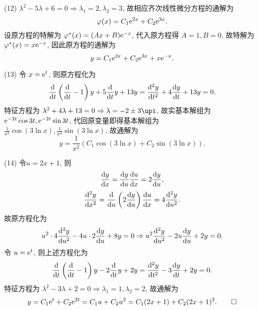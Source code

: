 \begin{solution}
  (12) $\lambda^2-5\lambda+6=0\Rightarrow\lambda_1=2,\lambda_2=3$, 故相应齐次线性微分方程的通解为
  \[\varphi(x)=C_1\mathrm{e}^{2x}+C_2\mathrm{e}^{3x}.\]
  设原方程的特解为 $\varphi^*(x)=(Ax+B)\mathrm{e}^{-x}$, 代入原方程得 $A=1,B=0$, 
  故特解为 $\varphi^*(x)=x\mathrm{e}^{-x}$, 因此原方程的通解为
  \[y=C_1\mathrm{e}^{2x}+C_2\mathrm{e}^{3x}+x\mathrm{e}^{-x}.\]

  (13) 令 $x=\mathrm{e}^t$, 则原方程化为
  \[\frac{\diff}{\diff t}\left(\frac{\diff}{\diff t}-1\right)y+5\frac{\diff}{\diff t}y+13y
    = \frac{\diff^2y}{\diff t^2}+4\frac{\diff y}{\diff t}+13y=0.\]
  特征方程为 $\lambda^2+4\lambda+13=0\Rightarrow\lambda=-2\pm3\upi$, 
  故实基本解组为 $\mathrm{e}^{-2t}\cos3t,\mathrm{e}^{-2t}\sin3t$, 
  代回原变量即得基本解组为 $\frac{1}{x^2}\cos(3\ln x),\frac{1}{x^2}\sin(3\ln x)$, 故通解为
  \[y=\frac{1}{x^2}(C_1\cos(3\ln x)+C_2\sin(3\ln x)).\]

  (14) 令$u=2x+1$, 则
  \[\frac{\diff y}{\diff x}=\frac{\diff y}{\diff u}\frac{\diff u}{\diff x}=2\frac{\diff y}{\diff u},\]
  \[\frac{\diff^2y}{\diff x^2}=\frac{\diff}{\diff u}\left(2\frac{\diff y}{\diff u}\right)\frac{\diff u}{\diff x}=4\frac{\diff^2y}{\diff u^2}.\]
  故原方程化为
  \[u^2\cdot4\frac{\diff^2y}{\diff u^2}-4u\cdot2\frac{\diff y}{\diff u}+8y=0
    \Rightarrow u^2\frac{\diff^2y}{\diff u^2}-2u\frac{\diff y}{\diff u}+2y=0.\]
  令 $u=\mathrm{e}^t$, 则上述方程化为
  \[\frac{\diff}{\diff t}\left(\frac{\diff}{\diff t}-1\right)y-2\frac{\diff}{\diff t}y+2y
    = \frac{\diff^2y}{\diff t^2}-3\frac{\diff y}{\diff t}+2y=0.\]
  特征方程为 $\lambda^2-3\lambda+2=0\Rightarrow\lambda_1=1,\lambda_2=2$, 故通解为
  \[y=C_1\mathrm{e}^t+C_2\mathrm{e}^{2t}=C_1u+C_2u^2=C_1(2x+1)+C_2(2x+1)^2.\qedhere\]
\end{solution}